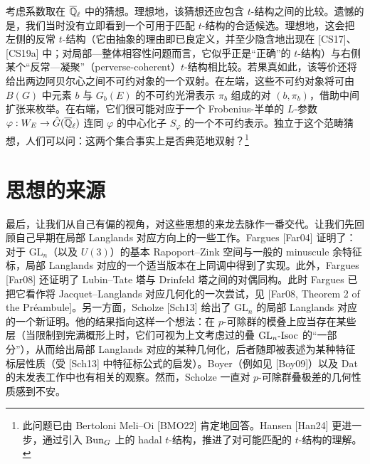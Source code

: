 
\begin{remark}
考虑系数取在 $\overline{\mathbb{Q}}_\ell$ 中的猜想。理想地，该猜想还应包含 $t$-结构之间的比较。遗憾的是，我们当时没有立即看到一个可用于匹配 $t$-结构的合适候选。理想地，这会把左侧的反常 $t$-结构（它由抽象的理由即已良定义，并至少隐含地出现在 [CS17]、[CS19a] 中；对局部—整体相容性问题而言，它似乎正是“正确”的 $t$-结构）与右侧某个“反常—凝聚”（perverse-coherent）$t$-结构相比较。若果真如此，该等价还将给出两边阿贝尔心之间不可约对象的一个双射。在左端，这些不可约对象将可由 $B(G)$ 中元素 $b$ 与 $G_b(E)$ 的不可约光滑表示 $\pi_b$ 组成的对 $(b,\pi_b)$，借助中间扩张来枚举。在右端，它们很可能对应于一个 Frobenius-半单的 $L$-参数 $\varphi:W_E\to\hat G(\overline{\mathbb{Q}}_\ell)$ 连同 $\varphi$ 的中心化子 $S_\varphi$ 的一个不可约表示。独立于这个范畴猜想，人们可以问：这两个集合事实上是否典范地双射？\footnote{此问题已由 Bertoloni Meli--Oi [BMO22] 肯定地回答。Hansen [Han24] 更进一步，通过引入 $\mathrm{Bun}_G$ 上的 hadal $t$-结构，推进了对可能匹配的 $t$-结构的理解。}
\end{remark}

\section{思想的来源}

最后，让我们从自己有偏的视角，对这些思想的来龙去脉作一番交代。让我们先回顾自己早期在局部 Langlands 对应方向上的一些工作。Fargues [Far04] 证明了：对于 $\mathrm{GL}_n$（以及 $U(3)$）的基本 Rapoport--Zink 空间与一般的 minuscule 余特征标，局部 Langlands 对应的一个适当版本在上同调中得到了实现。此外，Fargues [Far08] 还证明了 Lubin--Tate 塔与 Drinfeld 塔之间的对偶同构。此时 Fargues 已把它看作将 Jacquet--Langlands 对应几何化的一次尝试，见 [Far08, Theorem 2 of the Préambule]。另一方面，Scholze [Sch13] 给出了 $\mathrm{GL}_n$ 的局部 Langlands 对应的一个新证明。他的结果指向这样一个想法：在 $p$-可除群的模叠上应当存在某些层（当限制到完满概形上时，它们可视为上文考虑过的叠 $\mathrm{GL}_n\text{-}\mathrm{Isoc}$ 的“一部分”），从而给出局部 Langlands 对应的某种几何化，后者随即被表述为某种特征标层性质（受 [Sch13] 中特征标公式的启发）。Boyer（例如见 [Boy09]）以及 Dat 的未发表工作中也有相关的观察。然而，Scholze 一直对 $p$-可除群叠极差的几何性质感到不安。

